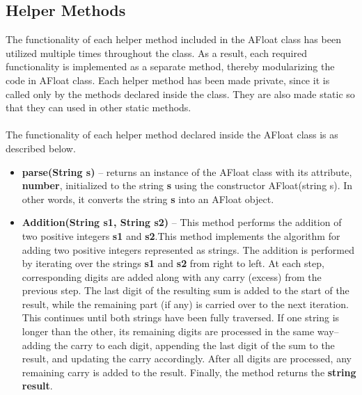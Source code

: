 \documentclass[a4paper,12pt]{article}
\begin{document}
{\subsection{Helper Methods}
The functionality of each helper method included in the AFloat class has been utilized multiple times throughout the class. As a result, each required functionality is implemented as a separate method, thereby modularizing the code in AFloat class. Each helper method has been made private, since it is called only by the methods declared inside the class. They are also made static so that they can used in other static methods.\\\\
The functionality of each helper method declared inside the AFloat class is as described below.

\begin{itemize}
    \item \textbf{parse(String s)} -- returns an instance of the AFloat class with its attribute, \textbf{number}, initialized to the string \textbf{s} using the constructor AFloat(string s). In other words, it converts the string \textbf{s} into an AFloat object.\\

    \item \textbf{Addition(String s1, String s2)} -- This method performs the addition of two positive integers \textbf{s1} and \textbf{s2}.This method implements the algorithm for adding two positive integers represented as strings. The addition is performed by iterating over the strings \textbf{s1} and \textbf{s2} from right to left. At each step, corresponding digits are added along with any carry (excess) from the previous step. The last digit of the resulting sum is added to the start of the result, while the remaining part (if any) is carried over to the next iteration. This continues until both strings have been fully traversed. If one string is longer than the other, its remaining digits are processed in the same way--adding the carry to each digit, appending the last digit of the sum to the result, and updating the carry accordingly. After all digits are processed, any remaining carry is added to the result. Finally, the method returns the \textbf{string result}.\\


\end{itemize}}
\end{document}
